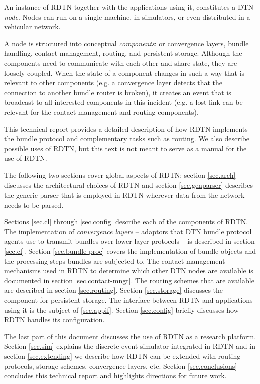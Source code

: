 \documentclass[a4paper]{article}
\begin{document}
An instance of RDTN together with the applications using it, constitutes a DTN
{\em node}. Nodes can run on a single machine, in simulators, or even
distributed in a vehicular network.

A node is structured into conceptual {\em components}: or convergence layers,
bundle handling, contact management, routing, and persistent storage.  Although
the components need to communicate with each other and share state, they are
loosely coupled. When the state of a component changes in such a way that is
relevant to other components (e.g. a convergence layer detects that the
connection to another bundle router is broken), it creates an event that is
broadcast to all interested components in this incident (e.g. a lost link can be
relevant for the contact management and routing components).

This technical report provides a detailed description of how RDTN implements the
bundle protocol and complementary tasks such as routing. We also describe
possible uses of RDTN, but this text is not meant to serve as a manual for the
use of RDTN.

The following two sections cover global aspects of RDTN: section \ref{sec.arch}
discusses the architectural choices of RDTN and section \ref{sec.genparser}
describes the generic parser that is employed in RDTN wherever data from the
network needs to be parsed.

Sections \ref{sec.cl} through \ref{sec.config} describe each of the components
of RDTN.  The implementation of {\em convergence layers} -- adaptors that DTN
bundle protocol agents use to transmit bundles over lower layer protocols -- is
described in section \ref{sec.cl}. Section \ref{sec.bundle-proc} covers the
implementation of bundle objects and the processing steps bundles are subjected
to. The contact management mechanisms used in RDTN to determine which other DTN
nodes are available is documented in section \ref{sec.contact-mngt}. The routing
schemes that are available are
described in section \ref{sec.routing}. Section \ref{sec.storage} discusses the
component for persistent storage. The interface between RDTN and applications
using it is the subject of \ref{sec.appif}. Section \ref{sec.config} briefly
discusses how RDTN handles its configuration.

The last part of this document discusses the use of RDTN as a research platform.
Section \ref{sec.sim} explains the discrete event simulator integrated in RDTN
and in section \ref{sec.extending} we describe how RDTN can be extended with
routing protocols, storage schemes, convergence layers, etc. Section
\ref{sec.conclusions} concludes this technical report and highlights directions
for future work.
\end{document}
